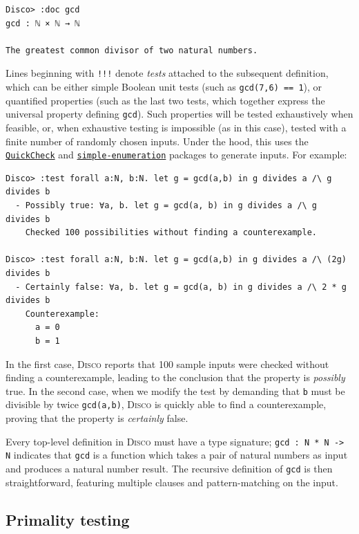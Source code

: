 \documentclass[copyright,creativecommons]{eptcs}
\newcommand{\disco}{\textsc{Disco}\xspace}
\newcommand{\pkg}[1]{\href{https://hackage.haskell.org/package/#1}{\texttt{#1}}}
\begin{document}
\begin{verbatim}
Disco> :doc gcd
gcd : ℕ × ℕ → ℕ

The greatest common divisor of two natural numbers.

\end{verbatim}

Lines beginning with \texttt{!!!} denote \emph{tests} attached to the
subsequent definition, which can be either simple Boolean unit tests
(such as \verb|gcd(7,6) == 1|), or quantified properties (such as the
last two tests, which together express the universal property defining
\verb|gcd|).  Such properties will be tested exhaustively when
feasible, or, when exhaustive testing is impossible (as in this case),
tested with a finite number of randomly chosen inputs. Under the hood,
this uses the \pkg{QuickCheck} \cite{claessen2000quickcheck} and
\pkg{simple-enumeration} packages to generate inputs.  For example:

\begin{verbatim}
Disco> :test forall a:N, b:N. let g = gcd(a,b) in g divides a /\ g divides b
  - Possibly true: ∀a, b. let g = gcd(a, b) in g divides a /\ g divides b
    Checked 100 possibilities without finding a counterexample.

Disco> :test forall a:N, b:N. let g = gcd(a,b) in g divides a /\ (2g) divides b
  - Certainly false: ∀a, b. let g = gcd(a, b) in g divides a /\ 2 * g divides b
    Counterexample:
      a = 0
      b = 1
\end{verbatim}

In the first case, \disco reports that 100 sample inputs were checked
without finding a counterexample, leading to the conclusion that the
property is \emph{possibly} true.  In the second case, when we modify
the test by demanding that \verb|b| must be divisible by twice
\verb|gcd(a,b)|, \disco is quickly able to find a counterexample,
proving that the property is \emph{certainly} false.

Every top-level definition in \disco must have a type signature;
\verb|gcd : N * N -> N| indicates that \verb|gcd| is a function which
takes a pair of natural numbers as input and produces a natural number
result.  The recursive definition of \verb|gcd| is then
straightforward, featuring multiple clauses and pattern-matching on
the input.

\subsection{Primality testing}
\label{sec:primetest}
\end{document}
